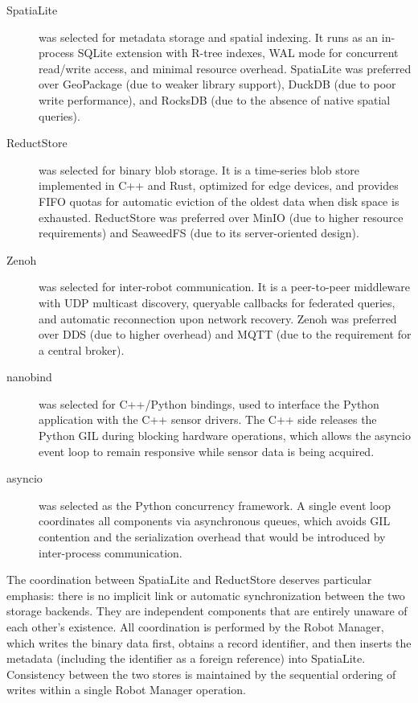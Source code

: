 \begin{description}
    \item[SpatiaLite] was selected for metadata storage and spatial indexing. It runs as an in-process SQLite extension with R-tree indexes, WAL mode for concurrent read/write access, and minimal resource overhead. SpatiaLite was preferred over GeoPackage (due to weaker library support), DuckDB (due to poor write performance), and RocksDB (due to the absence of native spatial queries).
    \item[ReductStore] was selected for binary blob storage. It is a time-series blob store implemented in C++ and Rust, optimized for edge devices, and provides FIFO quotas for automatic eviction of the oldest data when disk space is exhausted. ReductStore was preferred over MinIO (due to higher resource requirements) and SeaweedFS (due to its server-oriented design).
    \item[Zenoh] was selected for inter-robot communication. It is a peer-to-peer middleware with UDP multicast discovery, queryable callbacks for federated queries, and automatic reconnection upon network recovery. Zenoh was preferred over DDS (due to higher overhead) and MQTT (due to the requirement for a central broker).
    \item[nanobind] was selected for C++/Python bindings, used to interface the Python application with the C++ sensor drivers. The C++ side releases the Python GIL during blocking hardware operations, which allows the asyncio event loop to remain responsive while sensor data is being acquired.
    \item[asyncio] was selected as the Python concurrency framework. A single event loop coordinates all components via asynchronous queues, which avoids GIL contention and the serialization overhead that would be introduced by inter-process communication.
\end{description}

The coordination between SpatiaLite and ReductStore deserves particular emphasis: there is no implicit link or automatic synchronization between the two storage backends. They are independent components that are entirely unaware of each other's existence. All coordination is performed by the Robot Manager, which writes the binary data first, obtains a record identifier, and then inserts the metadata (including the identifier as a foreign reference) into SpatiaLite. Consistency between the two stores is maintained by the sequential ordering of writes within a single Robot Manager operation.


